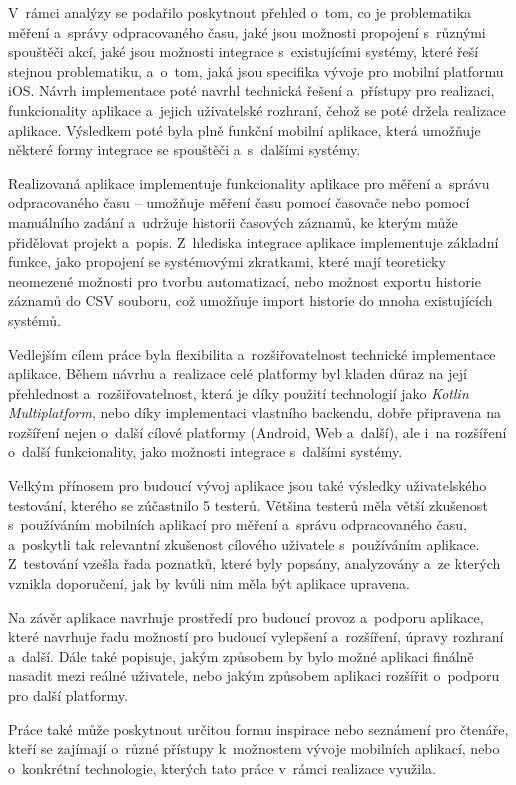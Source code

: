 V~rámci analýzy se podařilo poskytnout přehled o~tom, co je problematika měření a~správy odpracovaného času, jaké jsou možnosti propojení s~různými spouštěči akcí, jaké jsou možnosti integrace s~existujícími systémy, které řeší stejnou problematiku, a~o~tom, jaká jsou specifika vývoje pro mobilní platformu iOS. Návrh implementace poté navrhl technická řešení a~přístupy pro realizaci, funkcionality aplikace a~jejich uživatelské rozhraní, čehož se poté držela realizace aplikace. Výsledkem poté byla plně funkční mobilní aplikace, která umožňuje některé formy integrace se spouštěči a~s~dalšími systémy.

Realizovaná aplikace implementuje funkcionality aplikace pro měření a~správu odpracovaného času – umožňuje měření času pomocí časovače nebo pomocí manuálního zadání a~udržuje historii časových záznamů, ke kterým může přidělovat projekt a~popis. Z~hlediska integrace aplikace implementuje základní funkce, jako propojení se systémovými zkratkami, které mají teoreticky neomezené možnosti pro tvorbu automatizací, nebo možnost exportu historie záznamů do CSV souboru, což umožňuje import historie do mnoha existujících systémů.

Vedlejším cílem práce byla flexibilita a~rozšiřovatelnost technické implementace aplikace. Během návrhu a~realizace celé platformy byl kladen důraz na její přehlednost a~rozšiřovatelnost, která je díky použití technologií jako \emph{Kotlin Multiplatform}, nebo díky implementaci vlastního backendu, dobře připravena na rozšíření nejen o~další cílové platformy (Android, Web a~další), ale i~na rozšíření o~další funkcionality, jako možnosti integrace s~dalšími systémy.

Velkým přínosem pro budoucí vývoj aplikace jsou také výsledky uživatelského testování, kterého se zúčastnilo 5 testerů. Většina testerů měla větší zkušenost s~používáním mobilních aplikací pro měření a~správu odpracovaného času, a~poskytli tak relevantní zkušenost cílového uživatele s~používáním aplikace. Z~testování vzešla řada poznatků, které byly popsány, analyzovány a~ze kterých vznikla doporučení, jak by kvůli nim měla být aplikace upravena.

Na závěr aplikace navrhuje prostředí pro budoucí provoz a~podporu aplikace, které navrhuje řadu možností pro budoucí vylepšení a~rozšíření, úpravy rozhraní a~další. Dále také popisuje, jakým způsobem by bylo možné aplikaci finálně nasadit mezi reálné uživatele, nebo jakým způsobem aplikaci rozšířit o~podporu pro další platformy.

Práce také může poskytnout určitou formu inspirace nebo seznámení pro čtenáře, kteří se zajímají o~různé přístupy k~možnostem vývoje mobilních aplikací, nebo o~konkrétní technologie, kterých tato práce v~rámci realizace využila.



































